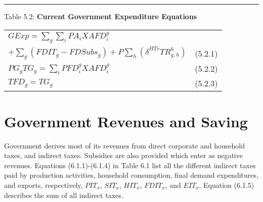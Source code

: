 \documentclass{article}
\begin{document}
\noindent\rule{\linewidth}{0.4pt}
\begin{center}
\begin{large}
{\centering Table 5.2: \textbf{Current Government Expenditure Equations} \par}

\begin{tabular}{>{\raggedright}p{} l}

$GExp = \displaystyle\sum_g\sum_iPA_iXAFD^g_i$\\
\hspace{31pt} $+ \displaystyle\sum_g \left(FDIT_g - FDSubs_g\right) + P\displaystyle\sum_h\left(\delta^{HTr}TR^h_{g, h}\right)$ & (5.2.1)\\[15pt]

$PG_gTG_g = \displaystyle\sum_iPFD^g_iX\!AFD^g_i$ & (5.2.2)\\[15pt]

$TFD_g = TG_g$ & (5.2.3)\\[20pt]


\hline
\end{tabular}
\end{large}
\end{center}

\section{Government Revenues and Saving}

Government derives most of its revenues from direct corporate and household taxes, and indirect taxes. Subsidies are also provided which enter as negative revenues. Equations (6.1.1)-(6.1.4) in Table 6.1 list all the different indirect taxes paid by production activities, household consumption, final demand expenditures, and exports, respectively, $PIT_x$, $SIT_x$, $HIT_x$, $FDIT_x$, and $EIT_x$. Equation (6.1.5) describes the sum of all indirect taxes.
\end{document}
